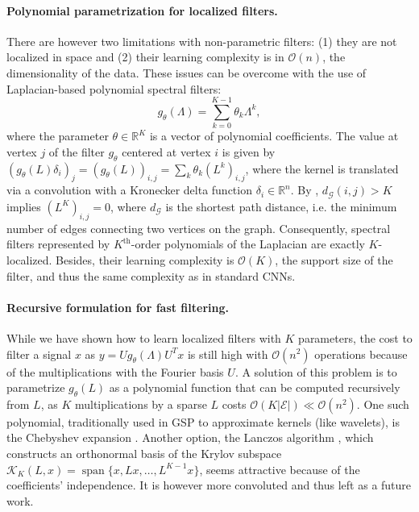 \documentclass{article}
\DeclareMathOperator*{\spn}{span}
\newcommand{\G}{\mathcal{G}}
\newcommand{\E}{\mathcal{E}}
\newcommand{\bO}{\mathcal{O}}
\newcommand{\R}{\mathbb{R}}
\begin{document}
\paragraph{Polynomial parametrization for localized filters.} There are however
two limitations with non-parametric filters: (1) they are not localized in space and (2)
their learning complexity is in $\bO(n)$, the dimensionality of the data. These issues can be overcome 
with the use of Laplacian-based polynomial spectral filters: 
\begin{equation} \label{eq:filt_poly}
	g_\theta(\Lambda) = \sum_{k=0}^{K-1} \theta_k \Lambda^k,
\end{equation}
where the parameter $\theta \in \R^K$ is a vector of polynomial coefficients.
The value at vertex $j$ of the filter $g_\theta$ centered at vertex $i$ is given
by $(g_\theta(L) \delta_i)_j = (g_\theta(L))_{i,j} = \sum_k \theta_k
(L^k)_{i,j}$, where the kernel is translated via a convolution with a Kronecker
delta function $\delta_i \in \R^n$. By \cite[Lemma
5.2]{art:HammondVandergheynstGribonval11GraphWav}, $d_\G(i,j) > K$ implies
$(L^K)_{i,j} = 0$, where $d_\G$ is the shortest path distance, i.e. the minimum number of edges connecting two vertices on the graph.
Consequently, spectral filters represented by $K^\text{th}$-order polynomials of
the Laplacian are exactly $K$-localized. Besides, their learning complexity is $\bO(K)$, the support size of the filter, and thus the same complexity as in standard CNNs.




\paragraph{Recursive formulation for fast filtering.} While we have shown how to
learn localized filters with $K$ parameters, the cost to filter a signal $x$ as
$y = Ug_\theta(\Lambda)U^Tx$ is still high with $\bO(n^2)$ operations because of the
multiplications with the Fourier basis $U$. A solution of this problem is to parametrize
$g_\theta(L)$ as a polynomial function that can be computed recursively from
$L$, as $K$ multiplications by a sparse $L$ costs $\bO(K|\E|) \ll \bO(n^2)$. One
such polynomial, traditionally used in GSP to approximate kernels (like
wavelets), is the Chebyshev expansion
\cite{art:HammondVandergheynstGribonval11GraphWav}. Another option, the Lanczos
algorithm \cite{art:SusnjaraPerraudinKressnerVandergheynst15Lanczos}, which
constructs an orthonormal basis of the Krylov subspace $\mathcal{K}_K(L,x) =
\spn\{x,Lx,\ldots,L^{K-1}x\}$, seems attractive because of the coefficients'
independence. It is however more convoluted and thus left as a future work.
\end{document}
